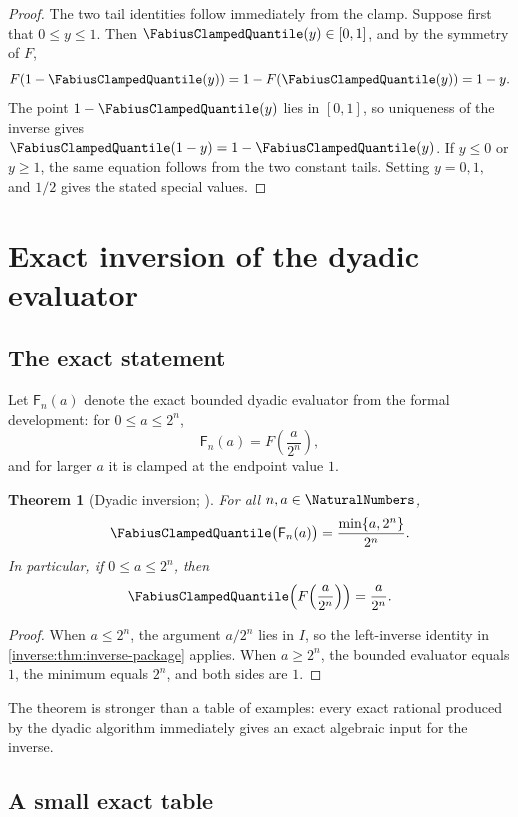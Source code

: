 \documentclass[11pt,oneside]{article}
\newtheorem{theorem}{Theorem}[section]
\theoremstyle{definition}
\theoremstyle{remark}
\begin{document}
\begin{proof}
The two tail identities follow immediately from the clamp.  Suppose first
that $0\leq y\leq1$.  Then $\FabiusClampedQuantile(y)\in[0,1]$, and by the symmetry of $F$,
\[
 F(1-\FabiusClampedQuantile(y))
   =1-F(\FabiusClampedQuantile(y))
   =1-y.
\]
The point $1-\FabiusClampedQuantile(y)$ lies in $[0,1]$, so uniqueness of the inverse gives
$\FabiusClampedQuantile(1-y)=1-\FabiusClampedQuantile(y)$.  If $y\leq0$ or $y\geq1$, the same equation follows
from the two constant tails.  Setting $y=0,1,$ and $1/2$ gives the stated
special values.
\end{proof}

\section{Exact inversion of the dyadic evaluator}
\label{inverse:sec:dyadic-inverse}

\subsection{The exact statement}

Let $\mathsf F_n(a)$ denote the exact bounded dyadic evaluator from the
formal development: for $0\leq a\leq2^n$,
\[
 \mathsf F_n(a)=F\!\left(\frac{a}{2^n}\right),
\]
and for larger $a$ it is clamped at the endpoint value $1$.

\begin{theorem}[Dyadic inversion; \Formalized]
\label{inverse:thm:dyadic-inversion}
For all $n,a\in\NaturalNumbers$,
\[
 \FabiusClampedQuantile\bigl(\mathsf F_n(a)\bigr)
 =\frac{\min\{a,2^n\}}{2^n}.
\]
In particular, if $0\leq a\leq2^n$, then
\[
 \FabiusClampedQuantile\!\left(F\!\left(\frac a{2^n}\right)\right)=\frac a{2^n}.
\]
\end{theorem}

\begin{proof}
When $a\leq2^n$, the argument $a/2^n$ lies in $I$, so the left-inverse
identity in \cref{inverse:thm:inverse-package} applies.  When $a\geq2^n$, the
bounded evaluator equals $1$, the minimum equals $2^n$, and both sides are
$1$.
\end{proof}

The theorem is stronger than a table of examples: every exact rational
produced by the dyadic algorithm immediately gives an exact algebraic
input for the inverse.

\subsection{A small exact table}
\end{document}
